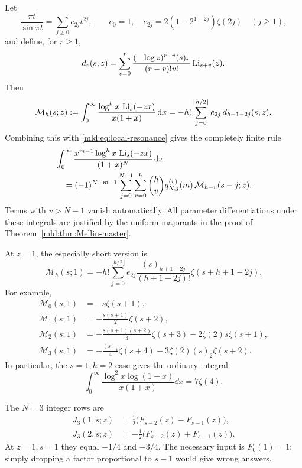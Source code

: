 Let
\[
 \frac{\pi t}{\sin\pi t}=\sum_{j\ge0}e_{2j}t^{2j},\qquad
 e_0=1,\quad e_{2j}=2(1-2^{1-2j})\zeta(2j)\quad(j\ge1),
\]
and define, for $r\ge1$,
\begin{equation}\label{mld:eq:dr}
 d_r(s,z)=\sum_{v=0}^{r}
       \frac{(-\log z)^{r-v}(s)_v}{(r-v)!v!}\operatorname{Li}_{s+v}(z).
\end{equation}
Then
\begin{equation}\label{mld:eq:M-moments}
 \mathcal M_h(s;z):=\int_0^\infty
       \frac{\log^h x\,\operatorname{Li}_s(-zx)}{x(1+x)}\,\mathrm{d} x
 =-h!\sum_{j=0}^{\lfloor h/2\rfloor}e_{2j}\,d_{h+1-2j}(s,z).
\end{equation}
Combining this with \eqref{mld:eq:local-resonance} gives the completely finite rule
\begin{align}\label{mld:eq:all-integer-moments}
 &\int_0^\infty\frac{x^{m-1}\log^h x\,\operatorname{Li}_s(-zx)}{(1+x)^N}\,\mathrm{d} x\notag\\
 &\quad=(-1)^{N+m-1}
   \sum_{j=0}^{N-1}\sum_{v=0}^{h}\binom hv
           q_{N,j}^{(v)}(m)\,\mathcal M_{h-v}(s-j;z).
\end{align}
Terms with $v>N-1$ vanish automatically. All parameter differentiations under these integrals are justified by the uniform majorants in the proof of Theorem~\ref{mld:thm:Mellin-master}.

At $z=1$, the especially short version is
\begin{equation}\label{mld:eq:unit-moments}
 \boxed{\displaystyle
 \mathcal M_h(s;1)=-h!\sum_{j=0}^{\lfloor h/2\rfloor}
   e_{2j}\frac{(s)_{h+1-2j}}{(h+1-2j)!}
                      \zeta(s+h+1-2j).}
\end{equation}
For example,
\begin{align*}
 \mathcal M_0(s;1)&=-s\zeta(s+1),\\
 \mathcal M_1(s;1)&=-\frac{s(s+1)}2\zeta(s+2),\\
 \mathcal M_2(s;1)&=-\frac{s(s+1)(s+2)}3\zeta(s+3)
                          -2\zeta(2)s\zeta(s+1),\\
 \mathcal M_3(s;1)&=-\frac{(s)_4}{4}\zeta(s+4)
                          -3\zeta(2)(s)_2\zeta(s+2).
\end{align*}
In particular, the $s=1,h=2$ case gives the ordinary integral
\[
 \int_0^\infty\frac{\log^2x\log(1+x)}{x(1+x)}\dd x=7\zeta(4).
\]

\begin{example}
The $N=3$ integer rows are
\begin{align*}
 J_3(1,s;z)&=\tfrac12\big(F_{s-2}(z)-F_{s-1}(z)\big),\\
 J_3(2,s;z)&=-\tfrac12\big(F_{s-2}(z)+F_{s-1}(z)\big).
\end{align*}
At $z=1,s=1$ they equal $-1/4$ and $-3/4$. The necessary input is $F_0(1)=1$; simply dropping a factor proportional to $s-1$ would give wrong answers.
\end{example}

